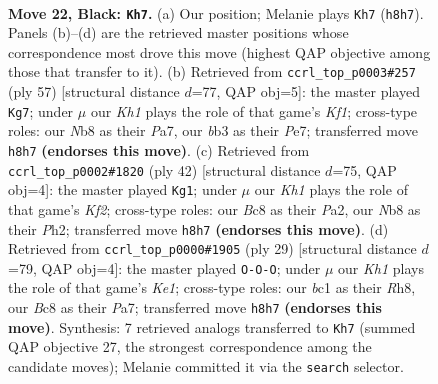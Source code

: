 \documentclass[11pt]{article}
\begin{document}
\clearpage

\begin{figure}[p]\centering
\begin{subfigure}{0.46\textwidth}\centering
\resizebox{\linewidth}{!}{%
\newchessgame
\chessboard[
  setfen={rnb1rb1k/ppp1p3/5n2/P1P5/8/1B3NR1/1P3P2/RNB1K3 b Q - 2 22},
  showmover=false,
  pgfstyle=straightmove, color=movearrow, markmove={h8-h7}
]}
\caption{}
\end{subfigure}\hfill
\begin{subfigure}{0.46\textwidth}\centering
\resizebox{\linewidth}{!}{%
\newchessgame
\chessboard[
  setfen={r4k2/pp2pp2/6p1/2nPNbP1/3R4/4R3/P3PPBK/2r5 b - - 2 29},
  showmover=false,
  pgfstyle=straightmove, color=movearrow, markmove={f8-g7}
]}
\caption{}
\end{subfigure}
\\[4pt]
\begin{subfigure}{0.46\textwidth}\centering
\resizebox{\linewidth}{!}{%
\newchessgame
\chessboard[
  setfen={3k1r2/1bp1n1r1/pp2p2p/8/3P2p1/2NBP1P1/PPR2K1P/2R5 w - - 0 22},
  showmover=false,
  pgfstyle=straightmove, color=movearrow, markmove={f2-g1}
]}
\caption{}
\end{subfigure}\hfill
\begin{subfigure}{0.46\textwidth}\centering
\resizebox{\linewidth}{!}{%
\newchessgame
\chessboard[
  setfen={r3kb1r/p1pn2pp/1p2p3/8/4P3/4BP2/PP4PP/2R1K1NR b Kkq - 1 15},
  showmover=false,
  pgfstyle=straightmove, color=movearrow, markmove={e8-c8}
]}
\caption{}
\end{subfigure}
\caption{\textbf{Move 22, Black: \texttt{Kh7}.} (a) Our position; Melanie plays \texttt{Kh7} (\texttt{h8h7}). Panels (b)--(d) are the retrieved master positions whose correspondence most drove this move (highest QAP objective among those that transfer to it). (b) Retrieved from \texttt{ccrl\_top\_p0003\#257} (ply 57) [structural distance $d$=77, QAP obj=5]: the master played \texttt{Kg7}; under $\mu$ our \emph{Kh1} plays the role of that game's \emph{Kf1}; cross-type roles: our \emph{N}b8 as their \emph{P}a7, our \emph{b}b3 as their \emph{P}e7; transferred move \texttt{h8h7} \textbf{(endorses this move)}. (c) Retrieved from \texttt{ccrl\_top\_p0002\#1820} (ply 42) [structural distance $d$=75, QAP obj=4]: the master played \texttt{Kg1}; under $\mu$ our \emph{Kh1} plays the role of that game's \emph{Kf2}; cross-type roles: our \emph{B}c8 as their \emph{P}a2, our \emph{N}b8 as their \emph{P}h2; transferred move \texttt{h8h7} \textbf{(endorses this move)}. (d) Retrieved from \texttt{ccrl\_top\_p0000\#1905} (ply 29) [structural distance $d$=79, QAP obj=4]: the master played \texttt{O-O-O}; under $\mu$ our \emph{Kh1} plays the role of that game's \emph{Ke1}; cross-type roles: our \emph{b}c1 as their \emph{R}h8, our \emph{B}c8 as their \emph{P}a7; transferred move \texttt{h8h7} \textbf{(endorses this move)}. Synthesis: 7 retrieved analogs transferred to \texttt{Kh7} (summed QAP objective 27, the strongest correspondence among the candidate moves); Melanie committed it via the \texttt{search} selector.}
\label{fig:thought-m43}
\end{figure}
\end{document}
